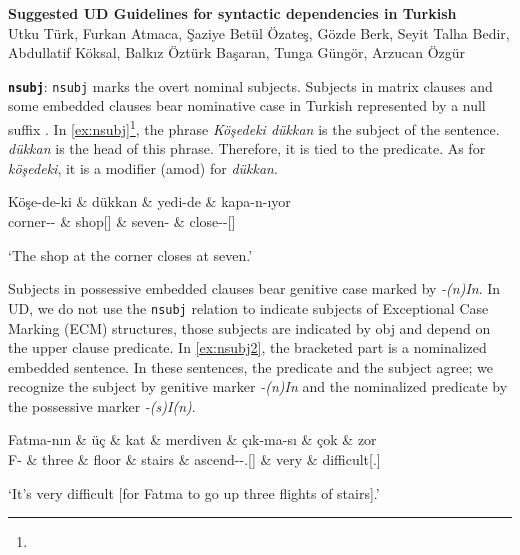 \documentclass[11pt,a4paper]{article}
\begin{document}
\begin{center}
    {\bf Suggested UD Guidelines for syntactic dependencies in Turkish}\\
    Utku Türk, Furkan Atmaca, Şaziye Betül Özateş, Gözde Berk, Seyit Talha Bedir, Abdullatif Köksal, Balkız Öztürk Başaran, Tunga Güngör, Arzucan Özgür
\end{center}

\textbf{\texttt{nsubj}}:
\texttt{nsubj} marks the overt nominal subjects. Subjects in matrix clauses and some embedded clauses bear nominative case in Turkish represented by a null suffix \citep{goksel2005}. In \autoref{ex:nsubj}\footnote{\printglossaries}, the phrase \textit{Köşedeki dükkan} is the subject of the sentence. \textit{dükkan} is the head of this phrase. Therefore, it is tied to the predicate. As for \textit{köşedeki}, it is a modifier (amod) for \textit{dükkan}.

\begin{exe}
\ex \label{ex:nsubj}
\begin{dependency}
\begin{deptext}
Köşe-de-ki \& dükkan \& yedi-de \& kapa-n-ıyor\\ 
corner-\Loc{}-\Ptcp{} \& shop[\Nom] \& seven-\Loc{} \& close-\Refl{}-\Prog{}[\Tsg]\\
\end{deptext}
\end{dependency}
\glt `The shop at the corner closes at seven.'
\end{exe}

Subjects in possessive embedded clauses bear genitive case marked by \textit{-(n)In}. In UD, we do not use the \texttt{nsubj} relation to indicate subjects of Exceptional Case Marking (ECM) structures, those subjects are indicated by obj and depend on the upper clause predicate. In \autoref{ex:nsubj2}, the bracketed part is a nominalized embedded sentence. In these sentences, the predicate and the subject agree; we recognize the subject by genitive marker \textit{-(n)In} and the nominalized predicate by the possessive marker \textit{-(s)I(n)}.

\begin{exe}
\ex \label{ex:nsubj2}
\begin{dependency}
\begin{deptext}[column sep=0.3cm]
Fatma-nın \& üç \& kat \& merdiven \& çık-ma-sı \& çok \& zor \\ 
F-\Gen{} \& three \& floor \& stairs \& ascend-\Nmlz{}-\Poss{}.\Tsg{}[\Nom] \& very \& difficult[\Cop.\Tsg]\\
\end{deptext}
\end{dependency}
\glt `It’s very difficult [for Fatma to go up three flights of stairs].'
\end{exe}
\end{document}
